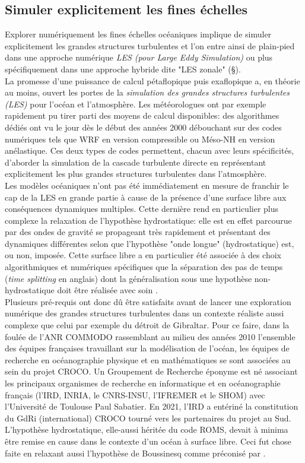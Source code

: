\subsection{Simuler explicitement les fines échelles}
\color{blue}
Explorer numériquement les fines échelles océaniques implique de simuler explicitement les grandes structures turbulentes et l'on entre ainsi de plain-pied dans une approche numérique \textit{LES (pour \textit{Large Eddy Simulation})} ou plus spécifiquement dans une approche hybride dite "LES zonale" (\S {}).\\
La promesse d’une puissance de calcul pétaflopique puis exaflopique a, en théorie au moins, ouvert les portes de la \textit{simulation des grandes structures turbulentes (LES)} pour l’océan et l’atmosphère. Les météorologues ont par exemple rapidement pu tirer parti des moyens de calcul disponibles: des algorithmes dédiés ont vu le jour dès le début des années 2000 débouchant sur des codes numériques tels que WRF \citep{skamarock_prototypes_2001} en version compressible ou Méso-NH \citep{lac_overview_2018} en version anélastique. Ces deux types de codes permettent, chacun avec leurs spécificités, d’aborder la simulation de la cascade turbulente directe en représentant explicitement les plus grandes structures turbulentes dans l’atmosphère.\\
Les modèles océaniques n’ont pas été immédiatement en mesure de franchir le cap de la LES en grande partie à cause de la présence d’une surface libre aux conséquences dynamiques multiples. Cette dernière rend en particulier plus complexe la relaxation de l’hypothèse hydrostatique: elle est en effet parcourue par des ondes de gravité se propageant très rapidement et présentant des dynamiques différentes selon que l'hypothèse "onde longue" (hydrostatique) est, ou non, imposée. Cette surface libre a en particulier été associée à des choix algorithmiques et numériques spécifiques que la séparation des pas de temps (\textit{time splitting} en anglais) dont la généralisation sous une hypothèse non-hydrostatique doit être réalisée avec soin \citep{auclair_non-hydrostatic_2011, Auclair2018}.\\
Plusieurs pré-requis ont donc dû être satisfaits avant de lancer une exploration numérique des grandes structures turbulentes dans un contexte réaliste aussi complexe que celui par exemple du détroit de Gibraltar.
Pour ce faire, dans la foulée de l’ANR COMMODO rassemblant au milieu des années 2010 l’ensemble des équipes françaises travaillant sur la modélisation de l’océan, les équipes de recherche en océanographie physique et en mathématiques se sont associées au sein du projet CROCO. Un Groupement de Recherche éponyme est né associant les principaux organismes de recherche en informatique et en océanographie français (l’IRD, INRIA, le CNRS-INSU, l’IFREMER et le SHOM) avec l'Université de Toulouse Paul Sabatier. En 2021, l’IRD a entériné la constitution du GdRi (international) CROCO tourné vers les partenaires du projet au Sud. L'hypothèse hydrostatique, elle-aussi héritée du code ROMS, devait à minima être remise en cause dans le contexte d'un océan à surface libre. Ceci fut chose faite en relaxant aussi l'hypothèse de Boussinesq comme préconisé par \cite{Auclair2018}.\\
